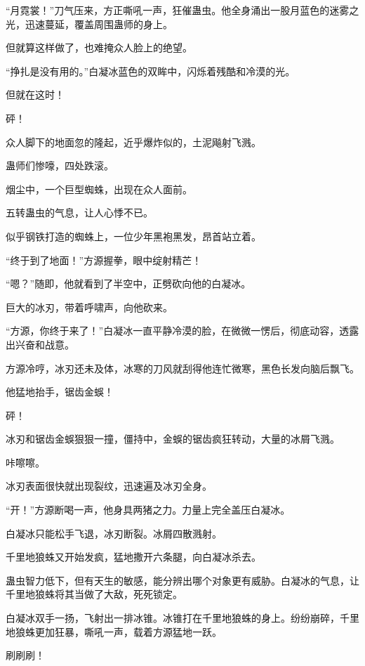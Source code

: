 
\begin{this_body}



“月霓裳！”刀气压来，方正嘶吼一声，狂催蛊虫。他全身涌出一股月蓝色的迷雾之光，迅速蔓延，覆盖周围蛊师的身上。

但就算这样做了，也难掩众人脸上的绝望。

“挣扎是没有用的。”白凝冰蓝色的双眸中，闪烁着残酷和冷漠的光。

但就在这时！

砰！

众人脚下的地面忽的隆起，近乎爆炸似的，土泥飚射飞溅。

蛊师们惨嚎，四处跌滚。

烟尘中，一个巨型蜘蛛，出现在众人面前。

五转蛊虫的气息，让人心悸不已。

似乎钢铁打造的蜘蛛上，一位少年黑袍黑发，昂首站立着。

“终于到了地面！”方源握拳，眼中绽射精芒！

“嗯？”随即，他就看到了半空中，正劈砍向他的白凝冰。

巨大的冰刃，带着呼啸声，向他砍来。

“方源，你终于来了！”白凝冰一直平静冷漠的脸，在微微一愣后，彻底动容，透露出兴奋和战意。

方源冷哼，冰刃还未及体，冰寒的刀风就刮得他连忙微寒，黑色长发向脑后飘飞。

他猛地抬手，锯齿金蜈！

砰！

冰刃和锯齿金蜈狠狠一撞，僵持中，金蜈的锯齿疯狂转动，大量的冰屑飞溅。

咔嚓嚓。

冰刃表面很快就出现裂纹，迅速遍及冰刃全身。

“开！”方源断喝一声，他身具两猪之力。力量上完全盖压白凝冰。

白凝冰只能松手飞退，冰刃断裂。冰屑四散溅射。

千里地狼蛛又开始发疯，猛地撒开六条腿，向白凝冰杀去。

蛊虫智力低下，但有天生的敏感，能分辨出哪个对象更有威胁。白凝冰的气息，让千里地狼蛛将其当做了大敌，死死锁定。

白凝冰双手一扬，飞射出一排冰锥。冰锥打在千里地狼蛛的身上。纷纷崩碎，千里地狼蛛更加狂暴，嘶吼一声，载着方源猛地一跃。

刷刷刷！


\end{this_body}

